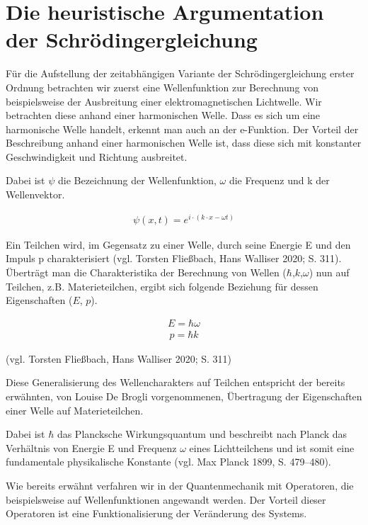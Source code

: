 \documentclass[12pt,oneside, a4paper]{scrbook}
\begin{document}
\chapter{Die heuristische Argumentation der Schrödingergleichung}

Für die Aufstellung der zeitabhängigen Variante der Schrödingergleichung erster Ordnung betrachten wir zuerst eine Wellenfunktion zur Berechnung von beispielsweise der Ausbreitung einer elektromagnetischen Lichtwelle. Wir betrachten diese anhand einer harmonischen Welle. Dass es sich um eine harmonische Welle handelt, erkennt man auch an der e-Funktion. Der Vorteil der Beschreibung anhand einer harmonischen Welle ist, dass diese sich mit konstanter Geschwindigkeit und Richtung ausbreitet.

Dabei ist $\psi$ die Bezeichnung der Wellenfunktion, $\omega$ die Frequenz und k der Wellenvektor.

\begin{align}
 \psi(x,t)= e^{i\cdot (k\cdot x-\omega t)}
\end{align}

Ein Teilchen wird, im Gegensatz zu einer Welle, durch seine Energie E und den Impuls p charakterisiert (vgl. Torsten Fließbach, Hans Walliser 2020; S. 311). Überträgt man die Charakteristika der Berechnung von Wellen ($\hbar$,$k$,$\omega$) nun auf Teilchen, z.B. Materieteilchen, ergibt sich folgende Beziehung für dessen Eigenschaften ($E$, $p$).

\begin{align}
 E = \hbar \omega
\end{align}
\begin{align}
 p = \hbar k
\end{align}
\begin{center}(vgl. Torsten Fließbach, Hans Walliser 2020; S. 311)\end{center}

Diese Generalisierung des Wellencharakters auf Teilchen entspricht der bereits erwähnten, von Louise De Brogli vorgenommenen, Übertragung der Eigenschaften einer Welle auf Materieteilchen.

Dabei ist $\hbar$ das Plancksche Wirkungsquantum und beschreibt nach Planck das Verhältnis von Energie E und Frequenz $\omega$ eines Lichtteilchens und ist somit eine fundamentale physikalische Konstante (vgl. Max Planck 1899, S. 479–480).

Wie bereits erwähnt verfahren wir in der Quantenmechanik mit Operatoren, die beispielsweise auf Wellenfunktionen angewandt werden. Der Vorteil dieser Operatoren ist eine Funktionalisierung der Veränderung des Systems. 
\end{document}
